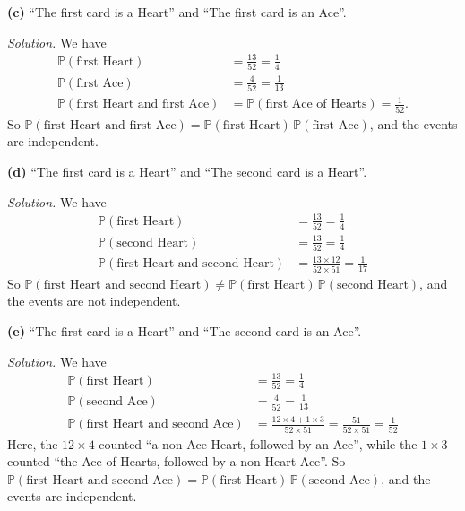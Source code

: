 \documentclass[
  a4paper,
]{book}
\theoremstyle{definition}
\theoremstyle{definition}
\theoremstyle{definition}
\theoremstyle{definition}
\theoremstyle{remark}
\begin{document}
\textbf{(c)} ``The first card is a Heart'' and ``The first card is an Ace''.

\begin{myanswers}
\emph{Solution.}
We have
\begin{align*}
\mathbb P(\text{first Heart}) &= \frac{13}{52} = \frac14 \\
\mathbb P(\text{first Ace}) &= \frac{4}{52} = \frac1{13} \\
\mathbb P(\text{first Heart and first Ace}) &= \mathbb P(\text{first Ace of Hearts}) = \frac1{52} .
\end{align*}
So \(\mathbb P(\text{first Heart and first Ace}) = \mathbb P(\text{first Heart})\,\mathbb P(\text{first Ace})\), and the events are independent.

\end{myanswers}

\textbf{(d)} ``The first card is a Heart'' and ``The second card is a Heart''.

\begin{myanswers}
\emph{Solution.}
We have
\begin{align*}
\mathbb P(\text{first Heart}) &= \frac{13}{52} = \frac14 \\
\mathbb P(\text{second Heart}) &= \frac{13}{52} = \frac14 \\
\mathbb P(\text{first Heart and second Heart}) &= \frac{13\times 12}{52 \times 51} = \frac{1}{17}
\end{align*}
So \(\mathbb P(\text{first Heart and second Heart}) \neq \mathbb P(\text{first Heart})\,\mathbb P(\text{second Heart})\), and the events are not independent.

\end{myanswers}

\textbf{(e)} ``The first card is a Heart'' and ``The second card is an Ace''.

\begin{myanswers}
\emph{Solution.}
We have
\begin{align*}
\mathbb P(\text{first Heart}) &= \frac{13}{52} = \frac14 \\
\mathbb P(\text{second Ace}) &= \frac{4}{52} = \frac1{13} \\
\mathbb P(\text{first Heart and second Ace}) &= \frac{12\times4 + 1\times 3}{52\times 51} = \frac{51}{52\times 51} = \frac{1}{52}
\end{align*}
Here, the \(12 \times 4\) counted ``a non-Ace Heart, followed by an Ace'', while the \(1 \times 3\) counted ``the Ace of Hearts, followed by a non-Heart Ace''. So \(\mathbb P(\text{first Heart and second Ace}) = \mathbb P(\text{first Heart})\,\mathbb P(\text{second Ace})\), and the events are independent.

\end{myanswers}
\end{document}
